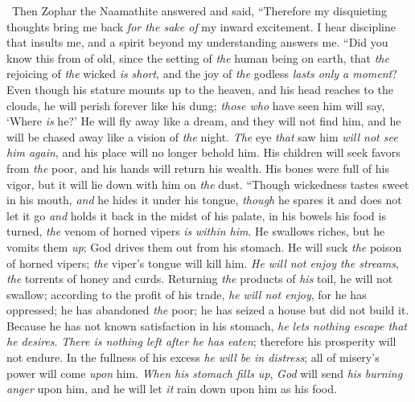 \begin{biblechapter} %
  Then Zophar the Naamathite answered and said,
\verse “Therefore my disquieting thoughts bring me back 
\textit{for the sake of} my inward excitement.
\verse I hear discipline that insults me, 
and a spirit beyond my understanding answers me.
\verse “Did you know this from of old, 
since the setting of \textit{the} human being on earth,
\verse that \textit{the} rejoicing of \textit{the} wicked \textit{is} \textit{short}, 
and the joy of \textit{the} godless \textit{lasts only a moment}?
\verse Even though his stature mounts up to the heaven, 
and his head reaches to the clouds,
\verse he will perish forever like his dung; 
\textit{those who} have seen him will say, ‘Where \textit{is} he?’
\verse He will fly away like a dream, and they will not find him, 
and he will be chased away like a vision of \textit{the} night.
\verse \textit{The} eye \textit{that} saw him \textit{will not see him again}, 
and his place will no longer behold him.
\verse His children will seek favors from \textit{the} poor, 
and his hands will return his wealth.
\verse His bones were full of his vigor, 
but it will lie down with him on \textit{the} dust.
\verse “Though wickedness tastes sweet in his mouth, 
\textit{and} he hides it under his tongue,
\verse \textit{though} he spares it and does not let it go 
\textit{and} holds it back in the midst of his palate,
\verse in his bowels his food is turned, 
\textit{the} venom of horned vipers \textit{is} \textit{within him}.
\verse He swallows riches, but he vomits them \textit{up}; 
God drives them out from his stomach.
\verse He will suck \textit{the} poison of horned vipers; 
\textit{the} viper’s tongue will kill him.
\verse \textit{He will not enjoy the streams}, 
\textit{the} torrents of honey and curds.
\verse Returning \textit{the} products of \textit{his} toil, he will not swallow; 
according to the profit of his trade, \textit{he will not enjoy},
\verse for he has oppressed; he has abandoned \textit{the} poor; 
he has seized a house but did not build it.
\verse Because he has not known satisfaction in his stomach, 
\textit{he lets nothing escape that he desires}.
\verse \textit{There is nothing left after he has eaten}; 
therefore his prosperity will not endure.
\verse In the fullness of his excess \textit{he will be in distress}; 
all of misery’s power will come \textit{upon} him.
\verse \textit{When his stomach fills up}, \textit{God} will send \textit{his burning anger} upon him, 
and he will let \textit{it} rain down upon him as his food.

\end{biblechapter}
